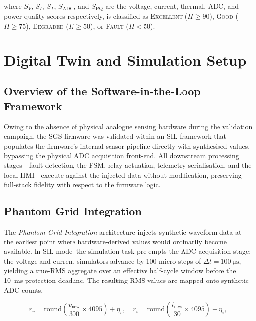 \documentclass[conference]{IEEEtran}
\begin{document}
\noindent
where $S_V$, $S_I$, $S_T$, $S_{\text{ADC}}$, and $S_{\text{PQ}}$ are
the voltage, current, thermal, ADC, and power-quality scores
respectively, is classified as \textsc{Excellent} ($H \geq 90$),
\textsc{Good} ($H \geq 75$), \textsc{Degraded} ($H \geq 50$), or
\textsc{Fault} ($H < 50$).

\section{Digital Twin and Simulation Setup}
\label{sec:digital_twin}

\subsection{Overview of the Software-in-the-Loop Framework}

Owing to the absence of physical analogue sensing hardware during the
validation campaign, the SGS firmware was validated within an SIL
framework that populates the firmware's internal sensor pipeline
directly with synthesised values, bypassing the physical ADC
acquisition front-end.  All downstream processing stages---fault
detection, the FSM, relay actuation, telemetry serialisation, and the
local HMI---execute against the injected data without modification,
preserving full-stack fidelity with respect to the firmware logic.

\subsection{Phantom Grid Integration}
\label{sec:phantom}

The \emph{Phantom Grid Integration} architecture injects synthetic
waveform data at the earliest point where hardware-derived values would
ordinarily become available.  In SIL mode, the simulation task
pre-empts the ADC acquisition stage: the voltage and current simulators
advance by 100 micro-steps of $\Delta t = \SI{100}{\micro\second}$,
yielding a true-RMS aggregate over an effective half-cycle window before
the \SI{10}{\milli\second} protection deadline.  The resulting RMS
values are mapped onto synthetic ADC counts,

\begin{equation}
  r_v = \text{round}\!\left(\frac{v_{\text{new}}}{300}\times 4095\right) + \eta_v,
  \quad
  r_i = \text{round}\!\left(\frac{i_{\text{new}}}{30}\times 4095\right) + \eta_i,
  \label{eq:adc_mapping}
\end{equation}
\end{document}
